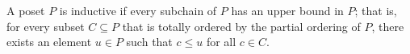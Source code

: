 A poset $P$ is inductive if every subchain of $P$ has an upper bound in $P$; that is, for every subset $C \subseteq P$ that is totally ordered by the partial ordering of $P$, there exists an element $u \in P$ such that $c \leq u$ for all $c \in C$.

